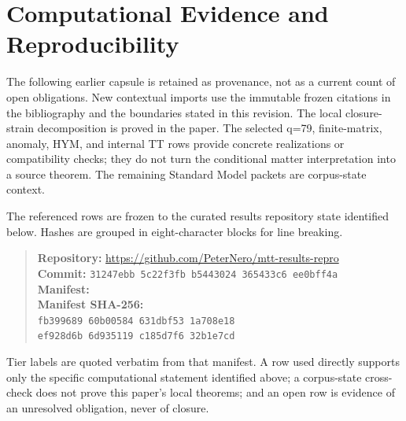 \documentclass[11pt]{article}
\begin{document}
\section*{Computational Evidence and Reproducibility}
The following earlier capsule is retained as provenance, not as a current
count of open obligations. New contextual imports use the immutable frozen
citations in the bibliography and the boundaries stated in this revision.
The local closure-strain decomposition is proved in the paper. The selected q=79, finite-matrix, anomaly, HYM, and internal TT rows provide concrete realizations or compatibility checks; they do not turn the conditional matter interpretation into a source theorem. The remaining Standard Model packets are corpus-state context.

The referenced rows are frozen to the curated results repository state identified below. Hashes are grouped in eight-character blocks for line breaking.
\begin{quote}\small
\textbf{Repository:} \url{https://github.com/PeterNero/mtt-results-repro}\\
\textbf{Commit:} \texttt{31247ebb 5c22f3fb b5443024 365433c6 ee0bff4a}\\
\textbf{Manifest:} \\
\textbf{Manifest SHA-256:}\\
\texttt{fb399689 60b00584 631dbf53 1a708e18}\\
\texttt{ef928d6b 6d935119 c185d7f6 32b1e7cd}
\end{quote}

Tier labels are quoted verbatim from that manifest. A row used directly supports only the specific computational statement identified above; a corpus-state cross-check does not prove this paper's local theorems; and an open row is evidence of an unresolved obligation, never of closure.
\end{document}
